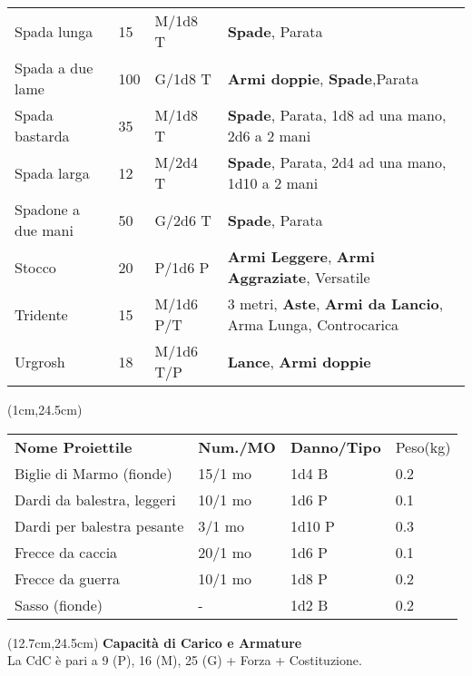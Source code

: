 \documentclass[a4paper,12 pt,openany]{book}
\begin{document}
\begin{textblock*}{19.5cm}
\begin{tabularx}{0.95\textwidth}{llll}
Spada lunga& 15 & M/1d8 T&\textbf{Spade}, Parata\\
Spada a due lame& 100& G/1d8 T& \textbf{Armi doppie}, \textbf{Spade},Parata\\
Spada bastarda& 35 & M/1d8 T&\textbf{Spade}, Parata, 1d8 ad una mano, 2d6 a 2 mani\\
Spada larga& 12 & M/2d4 T&\textbf{Spade}, Parata, 2d4 ad una mano, 1d10 a 2 mani\\
Spadone a due mani& 50 & G/2d6 T&\textbf{Spade}, Parata\\
Stocco& 20 & P/1d6 P& \textbf{Armi Leggere}, \textbf{Armi Aggraziate}, Versatile\\
Tridente& 15 & M/1d6 P/T& 3 metri, \textbf{Aste}, \textbf{Armi da Lancio}, Arma Lunga, Controcarica\\
Urgrosh& 18 & M/1d6 T/P& \textbf{Lance}, \textbf{Armi doppie}
\end{tabularx}

\end{textblock*}

\begin{textblock*}{11.5cm}(1cm,24.5cm) %

\begin{tabular}{llll}
\textbf{Nome Proiettile}   & \textbf{Num./MO} & \textbf{Danno/Tipo} & Peso(kg) \\
Biglie di Marmo (fionde)   & 15/1 mo                    & 1d4 B               & 0.2      \\
Dardi da balestra, leggeri & 10/1 mo                    & 1d6 P               & 0.1      \\
Dardi per balestra pesante & 3/1 mo                     & 1d10 P              & 0.3      \\
Frecce da caccia           & 20/1 mo                    & 1d6 P               & 0.1      \\
Frecce da guerra           & 10/1 mo                    & 1d8 P               & 0.2      \\
Sasso (fionde)             & -                          & 1d2 B               & 0.2      \\
\end{tabular}

\end{textblock*}

\begin{textblock*}{7.8cm}(12.7cm,24.5cm) %
\textbf{Capacità di Carico e Armature}\\
La CdC è pari a 9 (P), 16 (M), 25 (G) + Forza + Costituzione.
\end{textblock*}
\end{document}
